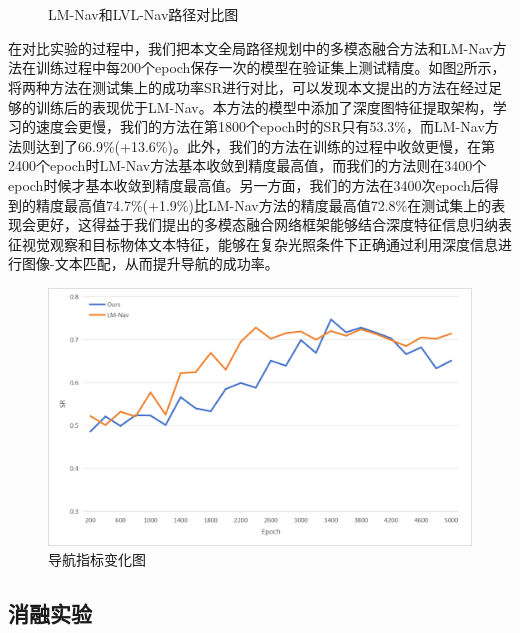 \begin{figure}[htbp]
    \centering
    \\
    \\
    \caption{LM-Nav和LVL-Nav路径对比图}
    \label{LM-NavcmpLVL-Nav}
\end{figure}
    
在对比实验的过程中，我们把本文全局路径规划中的多模态融合方法和LM-Nav方法在训练过程中每200个epoch保存一次的模型在验证集上测试精度。如图\ref{curvecmp}所示，将两种方法在测试集上的成功率SR进行对比，可以发现本文提出的方法在经过足够的训练后的表现优于LM-Nav。本方法的模型中添加了深度图特征提取架构，学习的速度会更慢，我们的方法在第1800个epoch时的SR只有53.3\%，而LM-Nav方法则达到了66.9\%(+13.6\%)。此外，我们的方法在训练的过程中收敛更慢，在第2400个epoch时LM-Nav方法基本收敛到精度最高值，而我们的方法则在3400个epoch时候才基本收敛到精度最高值。另一方面，我们的方法在3400次epoch后得到的精度最高值74.7\%(+1.9\%)比LM-Nav方法的精度最高值72.8\%在测试集上的表现会更好，这得益于我们提出的多模态融合网络框架能够结合深度特征信息归纳表征视觉观察和目标物体文本特征，能够在复杂光照条件下正确通过利用深度信息进行图像-文本匹配，从而提升导航的成功率。

\begin{figure}[htbp]
    \centering
    \includegraphics[scale=0.70]{Fig/curvecmp.png}
    \caption{\label{curvecmp}导航指标变化图}
\end{figure}



\subsection{消融实验}

